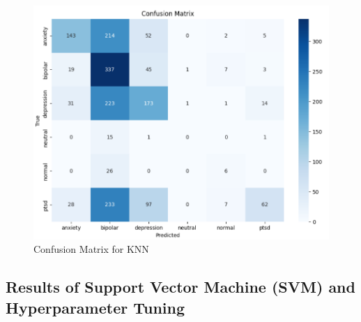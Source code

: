\begin{figure}[h!]  
    \centering
    \includegraphics[width=1.0\textwidth]{Images/Confusion Matrix KNN.png}  
    \caption{Confusion Matrix for KNN}
    \label{Confusion Matrix KNN}  %
\end{figure}

\pagebreak
\subsection{Results of Support Vector Machine (SVM) and Hyperparameter Tuning}


